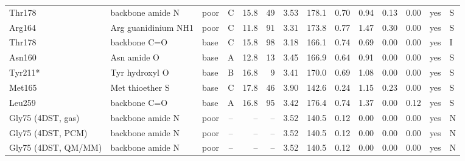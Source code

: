 \begin{table}[!htbp]
{\begin{tabular}{lllcrrrrrrrrll}
Thr178 & backbone amide N & poor & C & 15.8 & 49 & 3.53 & 178.1 & 0.70 & 0.94 & 0.13 & 0.00 & yes & S\\
Arg164 & Arg guanidinium NH1 & poor & C & 11.8 & 91 & 3.31 & 173.8 & 0.77 & 1.47 & 0.30 & 0.00 & yes & S\\
Thr178 & backbone C=O & base & C & 15.8 & 98 & 3.18 & 166.1 & 0.74 & 0.69 & 0.00 & 0.00 & yes & I\\
Asn160 & Asn amide O & base & A & 12.8 & 13 & 3.45 & 166.9 & 0.64 & 0.91 & 0.00 & 0.00 & yes & S\\
Tyr211* & Tyr hydroxyl O & base & B & 16.8 & 9 & 3.41 & 170.0 & 0.69 & 1.08 & 0.00 & 0.00 & yes & S\\
Met165 & Met thioether S & base & C & 17.8 & 46 & 3.90 & 142.6 & 0.24 & 1.15 & 0.23 & 0.00 & yes & S\\
Leu259 & backbone C=O & base & A & 16.8 & 95 & 3.42 & 176.4 & 0.74 & 1.37 & 0.00 & 0.12 & yes & S\\
\midrule
Gly75 (4DST, gas) & backbone amide N & poor & -- & -- & -- & 3.52 & 140.5 & 0.12 & 0.00 & 0.00 & 0.00 & yes & N\\
Gly75 (4DST, PCM) & backbone amide N & poor & -- & -- & -- & 3.52 & 140.5 & 0.12 & 0.00 & 0.00 & 0.00 & yes & N\\
Gly75 (4DST, QM/MM) & backbone amide N & poor & -- & -- & -- & 3.52 & 140.5 & 0.12 & 0.00 & 0.00 & 0.00 & yes & N\\
\bottomrule\end{tabular}}\end{table}
